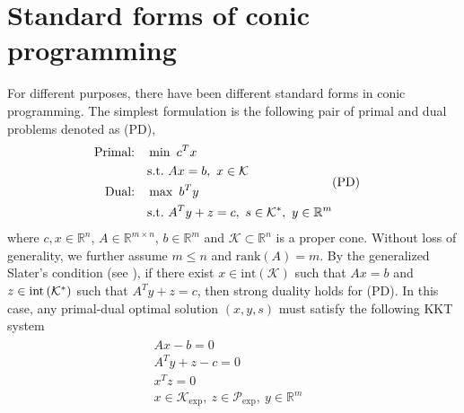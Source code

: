 \documentclass[11pt]{article}
\theoremstyle{definition}
\theoremstyle{plain}
\def\interior{\protect{\textnormal{int}}}
\begin{document}
\section{Standard forms of conic programming}
For different purposes, there have been different standard forms in conic programming. The simplest formulation is the following pair of primal and dual problems denoted as (PD), 
\begin{align}
\begin{split} 
\text{Primal:} \quad &\min\,\, c^Tx\\ 
&\textnormal{s.t.} \,\, Ax=b,\ x\in \mathcal{K} \\
\text{Dual:}  \quad &\max\,\, b^Ty \\
&\textnormal{s.t.} \,\, A^Ty+z=c,\ s\in\mathcal{K}^*,\ y \in \mathbb{R}^m \\
\end{split} &\text{(PD)} \nonumber
\end{align}
where $c,x \in \mathbb{R}^n$, $A\in \mathbb{R}^{m\times n}$, $b\in \mathbb{R}^m$ and $\mathcal{K} \subset \mathbb{R}^n$ is a proper cone. Without loss of generality, we further assume $m\leq n$ and $\text{rank}(A) = m$. By the generalized Slater's condition (see \cite{Boyd_Vander_Convex_Opt_Book}), if there exist
$x \in \text{int} \left(\mathcal{K}\right)$ such that $Ax=b$ and $z \in \interior \left(\mathcal{K}^*\right)$ such that $A^Ty+z=c$,
then strong duality holds for (PD). In this case, any primal-dual optimal solution $(x,y,s)$ must satisfy the following KKT system
\begin{align}\label{KKT_for_PD}
\begin{split}
Ax-b=0& \\
A^Ty+z-c=0& \\
x^Tz=0& \\
x\in\mathcal{K}_{\exp},\ z\in\mathcal{P}_{\exp},\ y\in\mathbb{R}^m& 
\end{split}
\end{align}
\end{document}
